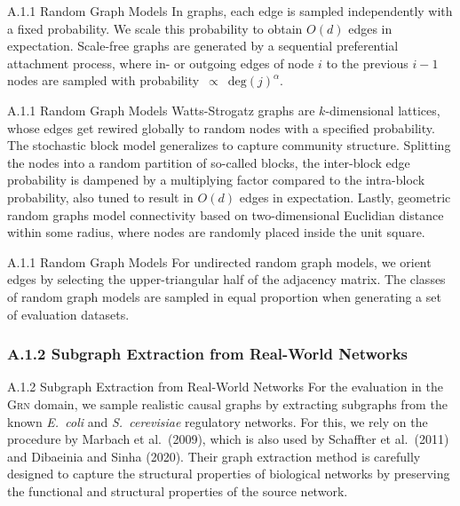 \documentclass[aspectratio=169,10pt]{beamer}
\newcommand{\domain}[1]{\textsc{#1}}
\newcommand{\grndomain}{\domain{Grn}\xspace}
\newcommand{\ecoli}{{\em E.\ coli}\xspace}
\newcommand{\yeast}{{\em S.\ cerevisiae}\xspace}
\newcommand\erdosrenyi{\text{Erd{\H{o}}s-R{\'e}nyi}\xspace}
\begin{document}
\begin{frame}{A.1.1 Random Graph Models}
\small
In \erdosrenyi graphs, each edge is sampled independently with a fixed probability. We scale this probability to obtain $O(d)$ edges in expectation. Scale-free graphs are generated by a sequential preferential attachment process, where in- or outgoing edges of node $i$ to the previous $i-1$ nodes are sampled with probability~$\propto$~$\text{deg}(j)^\alpha$.
\end{frame}

\begin{frame}{A.1.1 Random Graph Models}
\small
Watts-Strogatz graphs are $k$-dimensional lattices, whose edges get rewired globally to random nodes with a specified probability. The stochastic block model generalizes \erdosrenyi to capture community structure. Splitting the nodes into a random partition of so-called blocks, the inter-block edge probability is dampened by a multiplying factor compared to the intra-block probability, also tuned to result in $O(d)$ edges in expectation. Lastly, geometric random graphs model connectivity based on two-dimensional Euclidian distance within some radius, where nodes are randomly placed inside the unit square.
\end{frame}

\begin{frame}{A.1.1 Random Graph Models}
For undirected random graph models, we orient edges by selecting the upper-triangular half of the adjacency matrix. The classes of random graph models are sampled in equal proportion when generating a set of evaluation datasets.
\end{frame}

\subsubsection{A.1.2 Subgraph Extraction from Real-World Networks}

\begin{frame}{A.1.2 Subgraph Extraction from Real-World Networks}
For the evaluation in the \grndomain domain, we sample realistic causal graphs by extracting subgraphs from the known \ecoli and \yeast regulatory networks. For this, we rely on the procedure by Marbach et al.\ (2009), which is also used by Schaffter et al.\ (2011) and Dibaeinia and Sinha (2020). Their graph extraction method is carefully designed to capture the structural properties of biological networks by preserving the functional and structural properties of the source network.
\end{frame}
\end{document}

